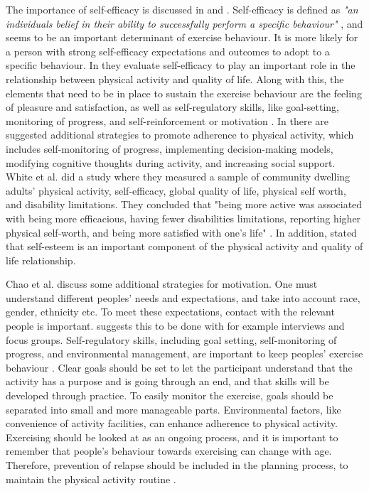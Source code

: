 The importance of self-efficacy is discussed in \cite{schutzer} and \cite{white}. Self-efficacy is defined as \emph{"an individuals belief in their ability to successfully perform a specific behaviour"} \cite{schutzer}, and seems to be an important determinant of exercise behaviour. It is more likely for a person with strong self-efficacy expectations and outcomes to adopt to a specific behaviour. In \cite{white} they evaluate self-efficacy to play an important role in the relationship between physical activity and quality of life. Along with this, the elements that need to be in place to sustain  the exercise behaviour are the feeling of pleasure and satisfaction, as well as self-regulatory skills, like goal-setting, monitoring of progress, and self-reinforcement or motivation  \cite{schutzer}. In \cite{chao} there are suggested additional strategies to promote adherence to physical activity, which includes self-monitoring of progress, implementing decision-making models, modifying cognitive thoughts during activity, and increasing social support. White et al. did a study where they measured a sample of community dwelling adults' physical activity, self-efficacy, global quality of life, physical self worth, and disability limitations. They concluded that "being more active was associated with being more efficacious, having fewer disabilities limitations, reporting higher physical self-worth, and being more satisfied with one's life" \cite{white}. In addition, \cite{white} stated that self-esteem is an important component of the physical activity and quality of life relationship. 

Chao et al. \cite{chao} discuss some additional strategies for motivation.  One must understand different peoples' needs and expectations, and take into account race, gender, ethnicity etc.  To meet these expectations, contact with the relevant people is important. \cite{chao} suggests this to be done with for example interviews and focus groups.  Self-regulatory skills, including goal setting, self-monitoring of progress, and environmental management, are important to keep peoples' exercise behaviour \cite{chao}. Clear goals should be set to let the participant understand that the activity has a purpose and is going through an end, and that skills will be developed through practice. To easily monitor the exercise, goals should be separated into small and more manageable parts. Environmental factors, like convenience of activity facilities, can enhance adherence to physical activity. Exercising should be looked at as an ongoing process, and it is important to remember that people's behaviour towards exercising can change with age. Therefore, prevention of relapse should be included in the planning process, to maintain the physical activity routine \cite{chao}. 

